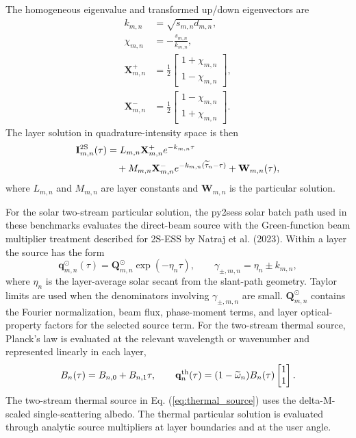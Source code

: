 \documentclass[gmd, manuscript]{copernicus}
\begin{document}
The homogeneous eigenvalue and transformed up/down eigenvectors are
\begin{equation}
\begin{aligned}
  k_{m,n} &= \sqrt{s_{m,n}d_{m,n}},\\
  \chi_{m,n} &= -\frac{s_{m,n}}{k_{m,n}},\\
  \mathbf{X}^{+}_{m,n}
    &=\frac{1}{2}
      \begin{bmatrix}1+\chi_{m,n}\\1-\chi_{m,n}\end{bmatrix},\\
  \mathbf{X}^{-}_{m,n}
    &=\frac{1}{2}
      \begin{bmatrix}1-\chi_{m,n}\\1+\chi_{m,n}\end{bmatrix}.
\end{aligned}
\label{eq:twostream_eigen}
\end{equation}
The layer solution in quadrature-intensity space is then
\begin{equation}
  \begin{split}
  \mathbf{I}_{m,n}^{\rm 2S}(\tau)
  &=
  L_{m,n}\mathbf{X}_{m,n}^{+}e^{-k_{m,n}\tau}\\
  &\quad
  +
  M_{m,n}\mathbf{X}_{m,n}^{-}e^{-k_{m,n}(\widetilde{\tau}_n-\tau)}
  +
  \mathbf{W}_{m,n}(\tau),
  \end{split}
  \label{eq:twostream_solution}
\end{equation}
where $L_{m,n}$ and $M_{m,n}$ are layer constants and $\mathbf{W}_{m,n}$ is the
particular solution.

For the solar two-stream particular solution, the py2sess solar batch path used in
these benchmarks evaluates the direct-beam source with the Green-function beam
multiplier treatment described for 2S-ESS by Natraj et al. (2023).  Within a layer the
source has the form
\begin{equation}
  \mathbf{q}_{m,n}^{\odot}(\tau)
  =
  \mathbf{Q}_{m,n}^{\odot}\exp(-\eta_{n}\tau),
  \qquad
  \gamma_{\pm,m,n}=\eta_n\pm k_{m,n},
  \label{eq:solar_green}
\end{equation}
where $\eta_n$ is the layer-average solar secant from the slant-path geometry.  Taylor
limits are used when the denominators involving $\gamma_{\pm,m,n}$ are small.
$\mathbf{Q}_{m,n}^{\odot}$ contains the Fourier normalization, beam flux, phase-moment
terms, and layer optical-property factors for the selected source term.  For the
two-stream thermal source, Planck's law is evaluated at the relevant wavelength or
wavenumber and represented linearly in each layer,
\begin{equation}
  B_n(\tau)=B_{n,0}+B_{n,1}\tau,\qquad
  \mathbf{q}_{n}^{\rm th}(\tau)
  =
  (1-\widetilde{\omega}_n)B_n(\tau)
  \begin{bmatrix}1\\1\end{bmatrix}.
  \label{eq:thermal_source}
\end{equation}
The two-stream thermal source in Eq. (\ref{eq:thermal_source}) uses the delta-M-scaled
single-scattering albedo.  The thermal particular solution is evaluated through
analytic source multipliers at layer boundaries and at the user angle.
\end{document}
